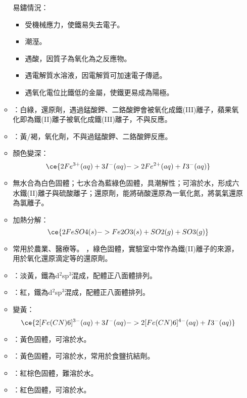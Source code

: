 \documentclass[a4paper,12pt]{report}
\begin{document}
\begin{itemize}
\begin{itemize}
易鏽情況：
\begin{itemize}
\item 受機械應力，使鐵易失去電子。
\item 潮溼。
\item 遇酸，因質子為氧化為之反應物。
\item 遇電解質水溶液，因電解質可加速電子傳遞。
\item 遇氧化電位比鐵低的金屬，使鐵更易成為陽極。
\end{itemize}
\bit
\item {}：白綠，還原劑，遇過錳酸鉀、二鉻酸鉀會被氧化成鐵(III)離子，蘋果氧化即為鐵(II)離子被氧化成鐵(III)離子，不與反應。
\item {}：黃/褐，氧化劑，不與過錳酸鉀、二鉻酸鉀反應。
\item {}顏色變深：
\[\ce{2Fe^{3+}(aq) + 3I^-(aq) -> 2Fe^{2+}(aq) + I3^-(aq)}\]
\eit
{}
\bit
\item 無水合為白色固體；七水合為藍綠色固體，具潮解性；可溶於水，形成六水鐵(II)離子與硫酸離子；還原劑，能將硝酸還原為一氧化氮，將氯氣還原為氯離子。
\item 加熱分解：
\[\ce{2FeSO4(s) -> Fe2O3(s) + SO2(g) + SO3(g)}\]
\item 常用於農業、醫療等。
\eit
{}
，綠色固體，實驗室中常作為鐵(II)離子的來源，用於氧化還原滴定等的還原劑。
\bit
\item {}：淡黃，鐵為d$^2$sp$^3$混成，配體正八面體排列。
\item {}：紅，鐵為d$^2$sp$^3$混成，配體正八面體排列。
\item {}變黃：
\[\ce{2[Fe(CN)6]^{3-}(aq) + 3I^-(aq) -> 2[Fe(CN)6]^{4-}(aq) + I3^-(aq)}\]
\item {}：黃色固體，可溶於水。
\item {}：黃色固體，可溶於水，常用於食鹽抗結劑。
\item {}：紅棕色固體，難溶於水。
\item {}：紅色固體，可溶於水。

\end{itemize}
\end{itemize}
\end{document}
